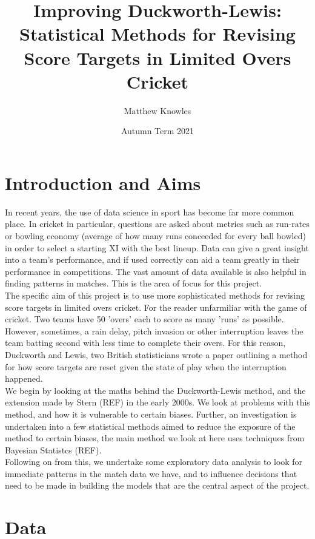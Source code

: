 \documentclass[11pt]{amsart}
\title[Improving DLS]{Improving Duckworth-Lewis: Statistical Methods for Revising Score Targets in Limited Overs Cricket}
\author{Matthew Knowles}
\date{Autumn Term 2021}
\begin{document}
\maketitle

\section{Introduction and Aims}
In recent years, the use of data science in sport has become far more common place. In cricket in particular, questions are asked about metrics such 
as run-rates or bowling economy (average of how many runs conceeded for every ball bowled) in order to select a starting XI with the best lineup. 
Data can give a great insight into a team's performance, and if used correctly can aid a team greatly in their performance in competitions.  The vast amount
of data available is also helpful in finding patterns in matches. This is the area of focus for this project. \\

The specific aim of this project is to use more sophisticated methods for revising score targets in limited overs cricket. For the reader unfarmiliar 
with the game of cricket. Two teams have 50 'overs' each to score as many 'runs' as possible. However, sometimes, a rain delay, pitch invasion 
or other interruption leaves the team batting second with less time to complete their overs. For this reason, Duckworth and Lewis, two British 
statisticians wrote a paper outlining a method for how score targets are reset given the state of play when the interruption happened. \citep{duckworth} \\

We begin by looking at the maths behind the Duckworth-Lewis method, and the extension made by Stern (REF) in the early 2000s. We look at problems
with this method, and how it is vulnerable to certain biases. Further, an investigation is undertaken into a few statistical methods aimed to 
reduce the exposure of the method to certain biases, the main method we look at here uses techniques from Bayesian Statistcs (REF).\\

Following on from this, we undertake some exploratory data analysis to look for immediate patterns in the match data we have, and to influence decisions
that need to be made in building the models that are the central aspect of the project. 

\section{Data}
\end{document}
